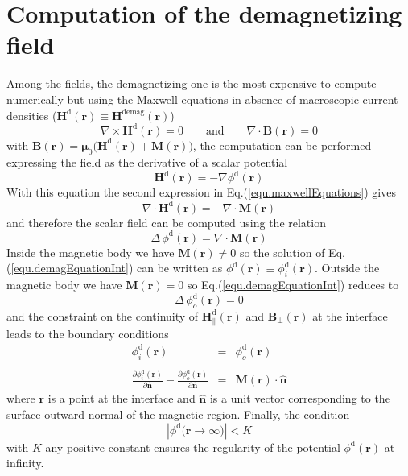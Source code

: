 \documentclass[11pt]{article}
\newcommand{\rv}[1]{\ensuremath{\mathbf{#1}}} %
\begin{document}
\section{Computation of the demagnetizing field }
Among the fields, the demagnetizing one is the most expensive to
compute numerically but using the Maxwell equations in absence of
macroscopic current densities 
($\rv{H}^\mathrm{d} \rv{(r)} \equiv \rv{H}^\mathrm{demag} \rv{(r)}$)
\begin{equation}
\nabla \times \rv{H}^\mathrm{d}\rv{(r)} = 0 \qquad \mathrm{and} \qquad \nabla \cdot \rv{B(r)} = 0 
\label{equ.maxwellEquations}
\end{equation}
with $\rv{B(r)=\mu}_0\rv{(H}^\mathrm{d} \rv{(r) + M(r))}$, the computation can
be performed expressing the field as the derivative of a scalar
potential
\begin{equation}
\rv{H}^\mathrm{d} \rv{(r)} = - \nabla \phi^\mathrm{d}\rv{(r)} 
\label{equ.demagPotential}
\end{equation}
With this equation the second expression in
Eq.(\ref{equ.maxwellEquations}) gives  
\begin{equation} 
\nabla \cdot \rv{H}^\mathrm{d} \rv{(r)} =  - \nabla \cdot \rv{M(r)} 
\label{equ.demagEquation}
\end{equation}
and therefore the scalar field can be computed using the relation 
\begin{equation}
\Delta \, \phi^\mathrm{d} \rv{(r)}  =  \nabla \cdot \rv{M(r)}  
\label{equ.demagEquationInt}
\end{equation}
Inside the magnetic body we have $ \rv{M(r)} \ne 0$ so the solution of
Eq.(\ref{equ.demagEquationInt}) can be written as \mbox{$\phi^\mathrm{d} \rv{(r)} \equiv
\phi^\mathrm{d}_i\rv{(r)}$}. Outside the magnetic body we have $ \rv{M(r)} = 0$ so
Eq.(\ref{equ.demagEquationInt}) reduces to  
\begin{equation}
\Delta \, \phi^\mathrm{d}_o\rv{(r)} =  0  
\label{equ.demagEquationExt}
\end{equation}
and the constraint on the continuity of $\rv{H}^\mathrm{d}_{\parallel}\rv{(r)}$ and
$\rv{B}_\perp\rv{(r)}$ at the interface leads to the boundary conditions 
\begin{eqnarray}
\phi^\mathrm{d}_i\rv{(r)}      & = & \phi^\mathrm{d}_o\rv{(r)} 
\label{equ.boundaryConditions1}
\\ && \nonumber \\
\frac{\partial \phi^\mathrm{d}_i\rv{(r)}}{\partial \rv{\hat{n}}} -
\frac{\partial \phi^\mathrm{d}_o\rv{(r)}}{\partial \rv{\hat{n}}} & = & \rv{M(r) \cdot \hat{n}} 
\label{equ.boundaryConditions2}
\end{eqnarray}
where $\rv{r}$ is a point at the interface and $\rv{\hat{n}}$ is a
unit vector corresponding to the surface outward normal of the magnetic region. 
Finally, the condition 
\begin{equation}
\left| \phi^\mathrm{d} \rv{(r} \to \infty) \right|  <  K
\label{equ.boundaryConditions3}
\end{equation}
with $K$ any positive constant ensures the regularity of the potential
$\phi^\mathrm{d}\rv{(r)}$ at infinity. 
\end{document}
